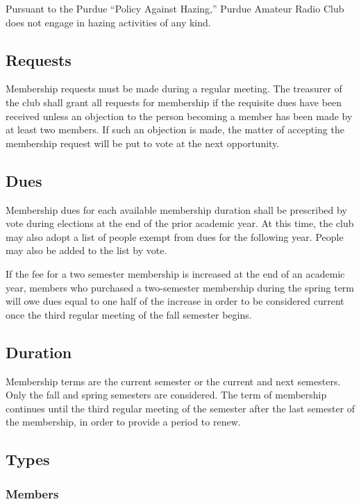 \documentclass{article}
\begin{document}
Pursuant to the Purdue ``Policy Against Hazing,'' Purdue Amateur Radio Club does
not engage in hazing activities of any kind.

\subsection{Requests}

Membership requests must be made during a regular meeting. The treasurer of the
club shall grant all requests for membership if the requisite dues have been
received unless an objection to the person becoming a member has been made by at
least two members. If such an objection is made, the matter of accepting the
membership request will be put to vote at the next opportunity.

\subsection{Dues}

Membership dues for each available membership duration shall be prescribed by
vote during elections at the end of the prior academic year. At this time, the
club may also adopt a list of people exempt from dues for the following year.
People may also be added to the list by vote.

If the fee for a two semester membership is increased at the end of an academic
year, members who purchased a two-semester membership during the spring term
will owe dues equal to one half of the increase in order to be considered
current once the third regular meeting of the fall semester begins.

\subsection{Duration}

Membership terms are the current semester or the current and next semesters.
Only the fall and spring semesters are considered. The term of membership
continues until the third regular meeting of the semester after the last
semester of the membership, in order to provide a period to renew.

\subsection{Types}

\subsubsection{Members}
\end{document}
